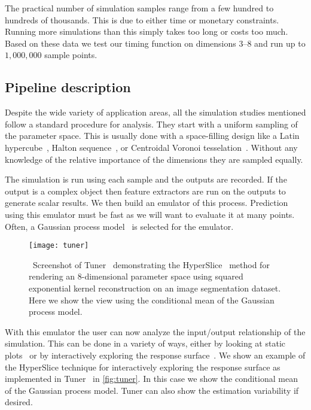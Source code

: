 The practical number of simulation samples range from a few hundred to hundreds
of thousands.  This is due to either time or monetary constraints.  Running more
simulations than this simply takes too long or costs too much.  
Based on these
data we test our timing function on dimensions $3$--$8$ and run up to 
$1,000,000$ sample points.


\subsection{Pipeline description}

Despite the wide variety of application areas, all the simulation studies 
mentioned follow a standard procedure for
analysis.
They start with a uniform sampling of the parameter space. This is
usually done with a space-filling
design like a Latin 
hypercube~\cite{Mckay:1979}, Halton
sequence~\cite{Halton:1964}, or Centroidal Voronoi tesselation~\cite{Du:1999}. 
Without any knowledge of the relative
importance of the dimensions they are sampled equally.

The
simulation is run using each sample and the outputs are recorded. If the
output is a complex object then feature
extractors are run on the outputs to generate scalar results.
We then build an emulator of this
process. Prediction using this emulator must be fast as we will want to
evaluate it at many points. Often, a Gaussian process
model~\cite{Rasmussen:2006} is selected for the emulator. 

\begin{figure}[htb]
  \centering
  \texttt{[image: tuner]}
  \caption[Tuner's HyperSlice view]{\
    Screenshot of Tuner~\cite{Torsney-Weir:2011} demonstrating the
    HyperSlice~\cite{Wijk:1993} method for rendering an
    $8$-dimensional parameter space using squared exponential kernel 
    reconstruction on an image segmentation dataset.
    Here we show the view using the conditional mean of the Gaussian 
    process model.
  } 
  \label{fig:tuner}
\end{figure}

With this emulator the user can now analyze the input\slash output
relationship of the simulation. This can be done in a variety of ways, either by
looking at static plots~\cite{Chapman:1994} or by interactively exploring the
response surface~\cite{Torsney-Weir:2011}. We show an example of the
HyperSlice technique for interactively exploring the response surface
as implemented in Tuner~\cite{Torsney-Weir:2011} in \autoref{fig:tuner}.  
In this case we show the conditional mean of the Gaussian process model.
Tuner can also show the estimation variability if desired.

